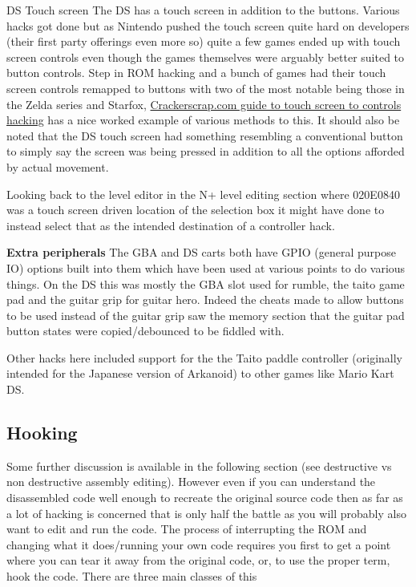 \documentclass[
]{book}
\begin{document}
DS Touch screen The DS has a touch screen in addition to the buttons. Various hacks got done but as Nintendo pushed the touch screen quite hard on developers (their first party offerings even more so) quite a few games ended up with touch screen controls even though the games themselves were arguably better suited to button controls. Step in ROM hacking and a bunch of games had their touch screen controls remapped to buttons with two of the most notable being those in the Zelda series and Starfox, \href{https://web.archive.org/web/20110604163902/http://crackerscrap.com/docs/sfchacktut.html}{Crackerscrap.com guide to touch screen to controls hacking} has a nice worked example of various methods to this. It should also be noted that the DS touch screen had something resembling a conventional button to simply say the screen was being pressed in addition to all the options afforded by actual movement.

Looking back to the level editor in the N+ level editing section where 020E0840 was a touch screen driven location of the selection box it might have done to instead select that as the intended destination of a controller hack.

\textbf{Extra peripherals} The GBA and DS carts both have GPIO (general purpose IO) options built into them which have been used at various points to do various things. On the DS this was mostly the GBA slot used for rumble, the taito game pad and the guitar grip for guitar hero. Indeed the cheats made to allow buttons to be used instead of the guitar grip saw the memory section that the guitar pad button states were copied/debounced to be fiddled with.

Other hacks here included support for the the Taito paddle controller (originally intended for the Japanese version of Arkanoid) to other games like Mario Kart DS.

\hypertarget{hooking}{%
\subsection{Hooking}\label{hooking}}

Some further discussion is available in the following section (see destructive vs non destructive assembly editing). However even if you can understand the disassembled code well enough to recreate the original source code then as far as a lot of hacking is concerned that is only half the battle as you will probably also want to edit and run the code. The process of interrupting the ROM and changing what it does/running your own code requires you first to get a point where you can tear it away from the original code, or, to use the proper term, hook the code. There are three main classes of this
\end{document}
